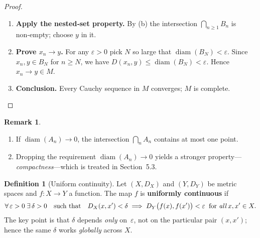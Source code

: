 \documentclass[12pt]{article}
\DeclareMathOperator{\diam}{diam}
\theoremstyle{definition} %
\newtheorem{remark}{Remark}
\newtheorem{definition}{Definition}
\theoremstyle{plain} %
\begin{document}
\begin{proof}
\begin{enumerate}[label=\arabic*.]
      \item \textbf{Apply the nested‐set property.}  
            By (b) the intersection
            \(
              \bigcap_{n\ge1}B_n
            \)
            is non‑empty; choose $y$ in it.

      \item \textbf{Prove $x_n\to y$.}  
            For any $\varepsilon>0$ pick $N$ so large that
            \(\diam(B_N)<\varepsilon\).  
            Since $x_n,y\in B_N$ for $n\ge N$, we have
            \(D(x_n,y)\le\diam(B_N)<\varepsilon\).
            Hence $x_n\to y\in M$.

      \item \textbf{Conclusion.}  
            Every Cauchy sequence in $M$ converges; $M$ is complete.
  \end{enumerate}
\end{proof}

\begin{remark}
  \begin{enumerate}[label=\textup{\arabic*.}, leftmargin=2.8em]
      \item If $\diam(A_n)\to 0$, the intersection $\bigcap_n A_n$ contains
            at most one point.
      \item Dropping the requirement $\diam(A_n)\to 0$ yields a stronger
            property—\emph{compactness}—which is treated in Section~5.3.
  \end{enumerate}
\end{remark}
\begin{definition}[Uniform continuity]
  Let $(X,D_X)$ and $(Y,D_Y)$ be metric spaces and  
  $f:X\to Y$ a function.  
  The map $f$ is \textbf{uniformly continuous} if
  \[
      \forall\,\varepsilon>0\;\exists\,\delta>0
      \quad\text{such that}\quad
      D_X(x,x')<\delta \;\Longrightarrow\;
      D_Y\bigl(f(x),f(x')\bigr)<\varepsilon
      \;\;\text{for \emph{all}}\,x,x'\in X.
  \]
  The key point is that $\delta$ depends \emph{only} on~$\varepsilon$,
  not on the particular pair $(x,x')$; hence the same $\delta$ works
  \emph{globally} across $X$.
\end{definition}

\bigskip
\noindent
\end{document}
